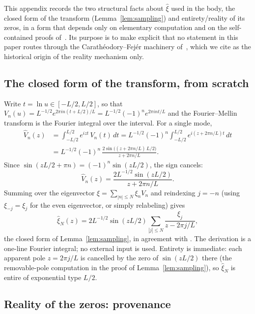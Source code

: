 \documentclass[11pt,a4paper]{article}
\begin{document}
This appendix records the two structural facts about $\widehat\xi$ used in the
body, the closed form of the transform (Lemma~\ref{lem:sampling}) and
entirety/reality of its zeros, in a form that depends only on elementary
computation and on the self-contained proofs of~\cite{CCM2025}. Its purpose is
to make explicit that no statement in this paper routes through the
Carath\'eodory--Fej\'er machinery of~\cite{CvS2025}, which we cite as the
historical origin of the reality mechanism only.

\subsection{The closed form of the transform, from scratch}\label{app:closedform}

Write $t=\ln u\in[-L/2,L/2]$, so that
$V_n(u)=L^{-1/2}e^{2\pi i n(t+L/2)/L}=L^{-1/2}(-1)^n e^{2\pi i nt/L}$ and the
Fourier--Mellin transform is the Fourier integral over the interval. For a
single mode,
\begin{align*}
  \widehat V_n(z)&=\int_{-L/2}^{L/2}e^{izt}\,V_n(t)\,dt
  =L^{-1/2}(-1)^n\int_{-L/2}^{L/2}e^{i(z+2\pi n/L)t}\,dt\\
  &=L^{-1/2}(-1)^n\,\frac{2\sin\!\bigl((z+2\pi n/L)\,L/2\bigr)}{z+2\pi n/L}.
\end{align*}
Since $\sin(zL/2+\pi n)=(-1)^n\sin(zL/2)$, the sign cancels:
\[
  \widehat V_n(z)=\frac{2L^{-1/2}\sin(zL/2)}{z+2\pi n/L}.
\]
Summing over the eigenvector $\xi=\sum_{|n|\le N}\xi_n V_n$ and reindexing
$j=-n$ (using $\xi_{-j}=\xi_j$ for the even eigenvector, or simply relabeling)
gives
\[
  \widehat\xi_N(z)=2L^{-1/2}\sin(zL/2)\sum_{|j|\le N}\frac{\xi_j}{z-2\pi j/L},
\]
the closed form of Lemma~\ref{lem:sampling}, in agreement with
\cite[Prop.~5.9]{CCM2025}. The derivation is a one-line Fourier integral; no
external input is used. Entirety is immediate: each apparent pole
$z=2\pi j/L$ is cancelled by the zero of $\sin(zL/2)$ there (the removable-pole
computation in the proof of Lemma~\ref{lem:sampling}), so $\widehat\xi_N$ is
entire of exponential type $L/2$.

\subsection{Reality of the zeros: provenance}\label{app:reality}
\end{document}
